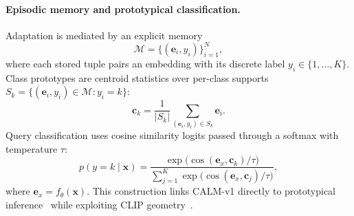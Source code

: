 \documentclass[12pt,a4paper]{report}
\begin{document}
\paragraph{Episodic memory and prototypical classification.}
Adaptation is mediated by an explicit memory
\begin{equation}
  \mathcal{M} = \{(\mathbf{e}_i, y_i)\}_{i=1}^{N},
\end{equation}
where each stored tuple pairs an embedding with its discrete label $y_i \in \{1,\ldots,K\}$. Class prototypes are centroid statistics over per-class supports $S_k = \{(\mathbf{e}_i,y_i)\in\mathcal{M} : y_i=k\}$:
\begin{equation}
  \mathbf{c}_k = \frac{1}{|S_k|} \sum_{(\mathbf{e}_i, y_i) \in S_k} \mathbf{e}_i.
  \label{eq:prototype}
\end{equation}
Query classification uses cosine similarity logits passed through a softmax with temperature $\tau$:
\begin{equation}
  p(y=k\mid\mathbf{x}) = \frac{\exp\bigl(\cos(\mathbf{e}_x, \mathbf{c}_k)/\tau\bigr)}{\sum_{j=1}^{K} \exp\bigl(\cos(\mathbf{e}_x, \mathbf{c}_j)/\tau\bigr)},
  \label{eq:classification}
\end{equation}
where $\mathbf{e}_x = f_\theta(\mathbf{x})$. This construction links CALM-v1 directly to prototypical inference~\cite{r3} while exploiting CLIP geometry~\cite{r1}.
\end{document}
